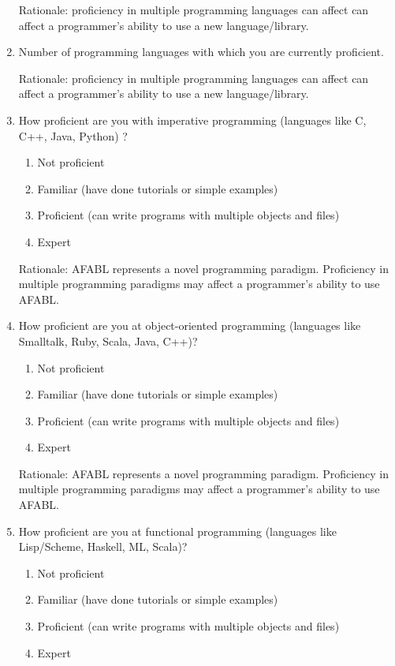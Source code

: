 \begin{appendices}
\begin{enumerate}
Rationale: proficiency in multiple programming languages can affect can affect a programmer’s ability to use a new language/library.

\item Number of programming languages with which you are currently proficient.

Rationale: proficiency in multiple programming languages can affect can affect a programmer’s ability to use a new language/library.

\item How proficient are you with imperative programming (languages like C, C++, Java, Python) ?
\begin{enumerate}
\item Not proficient
\item Familiar (have done tutorials or simple examples)
\item Proficient (can write programs with multiple objects and files)
\item Expert
\end{enumerate}

Rationale: AFABL represents a novel programming paradigm.  Proficiency in multiple programming paradigms may affect a programmer’s ability to use AFABL.

\item How proficient are you at object-oriented programming (languages like Smalltalk, Ruby, Scala, Java, C++)?  
\begin{enumerate}
\item Not proficient
\item Familiar (have done tutorials or simple examples)
\item Proficient (can write programs with multiple objects and files)
\item Expert
\end{enumerate}

Rationale: AFABL represents a novel programming paradigm.  Proficiency in multiple programming paradigms may affect a programmer’s ability to use AFABL.

\item How proficient are you at functional programming (languages like Lisp/Scheme, Haskell, ML, Scala)?  
\begin{enumerate}
\item Not proficient
\item Familiar (have done tutorials or simple examples)
\item Proficient (can write programs with multiple objects and files)
\item Expert
\end{enumerate}


\end{enumerate}
\end{appendices}
